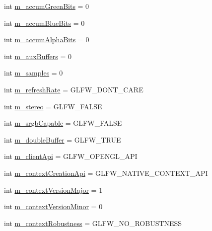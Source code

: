 \begin{DoxyCompactItemize}
\item 
int \mbox{\hyperlink{structec_1_1_window_creation_hints_ae708400790925cf17fcab2186940447d}{m\+\_\+accum\+Green\+Bits}} = 0
\item 
int \mbox{\hyperlink{structec_1_1_window_creation_hints_ae6939e4ae26c47c70e7c3d26fe882120}{m\+\_\+accum\+Blue\+Bits}} = 0
\item 
int \mbox{\hyperlink{structec_1_1_window_creation_hints_a41a825d31e2251b3ddcade624bc7eb20}{m\+\_\+accum\+Alpha\+Bits}} = 0
\item 
int \mbox{\hyperlink{structec_1_1_window_creation_hints_abe286fe11064c4dff0d078b7e5825f1e}{m\+\_\+aux\+Buffers}} = 0
\item 
int \mbox{\hyperlink{structec_1_1_window_creation_hints_ad6ebba67b73f17ee7b34c779988a8c00}{m\+\_\+samples}} = 0
\item 
int \mbox{\hyperlink{structec_1_1_window_creation_hints_ae03421b167b685961ace24c627d4d505}{m\+\_\+refresh\+Rate}} = G\+L\+F\+W\+\_\+\+D\+O\+N\+T\+\_\+\+C\+A\+RE
\item 
int \mbox{\hyperlink{structec_1_1_window_creation_hints_a729a2e0579e6344b78daa04f9ed34a9b}{m\+\_\+stereo}} = G\+L\+F\+W\+\_\+\+F\+A\+L\+SE
\item 
int \mbox{\hyperlink{structec_1_1_window_creation_hints_a2576a923073dc4699bd5378d3b273408}{m\+\_\+srgb\+Capable}} = G\+L\+F\+W\+\_\+\+F\+A\+L\+SE
\item 
int \mbox{\hyperlink{structec_1_1_window_creation_hints_a2ac2f95887ced649f6d6c92425c2c300}{m\+\_\+double\+Buffer}} = G\+L\+F\+W\+\_\+\+T\+R\+UE
\item 
int \mbox{\hyperlink{structec_1_1_window_creation_hints_a5af7038b95e4b6bd50f650bf67e5a2f8}{m\+\_\+client\+Api}} = G\+L\+F\+W\+\_\+\+O\+P\+E\+N\+G\+L\+\_\+\+A\+PI
\item 
int \mbox{\hyperlink{structec_1_1_window_creation_hints_aedfdcddc4cac629d6f1533551cd76559}{m\+\_\+context\+Creation\+Api}} = G\+L\+F\+W\+\_\+\+N\+A\+T\+I\+V\+E\+\_\+\+C\+O\+N\+T\+E\+X\+T\+\_\+\+A\+PI
\item 
int \mbox{\hyperlink{structec_1_1_window_creation_hints_a4a14a7429110d8ed1d1a958bd411977e}{m\+\_\+context\+Version\+Major}} = 1
\item 
int \mbox{\hyperlink{structec_1_1_window_creation_hints_a2be432af29a647f44bba87ee5d6225e4}{m\+\_\+context\+Version\+Minor}} = 0
\item 
int \mbox{\hyperlink{structec_1_1_window_creation_hints_ae07d3125cec0371769c080aba56a9a3b}{m\+\_\+context\+Robustness}} = G\+L\+F\+W\+\_\+\+N\+O\+\_\+\+R\+O\+B\+U\+S\+T\+N\+E\+SS

\end{DoxyCompactItemize}

